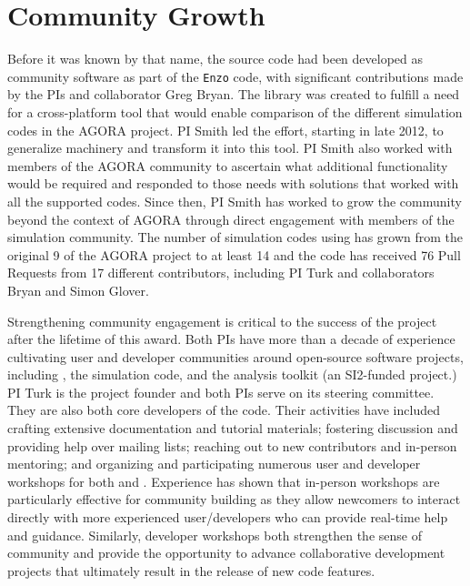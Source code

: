 \section{Community Growth}\label{sec:community_growth}

Before it was known by that name, the \grackle{} source code had
been developed as community software as part of the \texttt{Enzo}
code, with significant contributions made by the PIs and collaborator
Greg Bryan.  The \grackle{} library was created to fulfill a need
for a cross-platform tool that would enable comparison of the
different simulation codes in the AGORA project.  PI Smith led the
effort, starting in late 2012, to generalize  machinery
and transform it into this tool.  PI Smith also worked with members of
the AGORA community to ascertain what additional functionality would be
required and responded to those needs with solutions that worked with
all the supported codes.  Since then, PI Smith has worked to grow the
\grackle{} community beyond the context of AGORA through direct
engagement with members of the simulation community.  The number of
simulation codes using \grackle{} has grown from the original 9 of the
AGORA project to at least 14 and the code has received 76 Pull
Requests from 17 different contributors, including PI Turk and
collaborators Bryan and Simon Glover.

Strengthening community engagement is critical to the success of the
\grackle{} project after the lifetime of this award.  Both PIs
have more than a decade of experience cultivating user and developer
communities around open-source software projects, including
\grackle{}, the \enzo{} simulation code, and the \yt{} analysis
toolkit (an SI2-funded project.)  PI Turk is the \yt{} project founder
and both PIs serve on its steering committee.  They are also both core
developers of the \enzo{} code.  Their activities have included
crafting extensive documentation and tutorial materials; fostering
discussion and providing help over mailing lists; reaching out to new
contributors and in-person mentoring; and organizing and participating
numerous user and developer workshops for both \enzo{} and \yt{}.
Experience has shown that in-person workshops are particularly
effective for community building as they allow newcomers to interact
directly with more experienced user/developers who can provide
real-time help and guidance.  Similarly, developer workshops both
strengthen the sense of community and provide the opportunity to
advance collaborative development projects that ultimately result in
the release of new code features.

